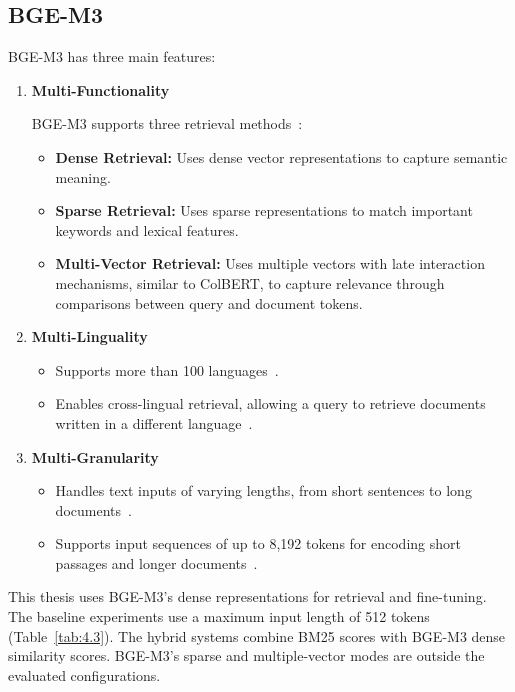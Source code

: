 \subsection{BGE-M3}

BGE-M3 has three main features:
\begin{enumerate}
    \item \textbf{Multi-Functionality}

    BGE-M3 supports three retrieval methods~\cite{bgem3card}:
    \begin{itemize}
        \item \textbf{Dense Retrieval:} Uses dense vector representations to capture semantic meaning.
        \item \textbf{Sparse Retrieval:} Uses sparse representations to match important keywords and lexical features.
        \item \textbf{Multi-Vector Retrieval:} Uses multiple vectors with late interaction mechanisms, similar to ColBERT, to capture relevance through comparisons between query and document tokens.
    \end{itemize}

    \item \textbf{Multi-Linguality}
    \begin{itemize}
        \item Supports more than 100 languages~\cite{chen2024}.
        \item Enables cross-lingual retrieval, allowing a query to retrieve documents written in a different language~\cite{chen2024}.
    \end{itemize}

    \item \textbf{Multi-Granularity}
    \begin{itemize}
        \item Handles text inputs of varying lengths, from short sentences to long documents~\cite{bgem3card}.
        \item Supports input sequences of up to 8,192 tokens for encoding short passages and longer documents~\cite{bgem3card}.
    \end{itemize}
\end{enumerate}

This thesis uses BGE-M3's dense representations for retrieval and fine-tuning. The baseline experiments use a maximum input length of 512 tokens (Table~\ref{tab:4.3}). The hybrid systems combine BM25 scores with BGE-M3 dense similarity scores. BGE-M3's sparse and multiple-vector modes are outside the evaluated configurations.

